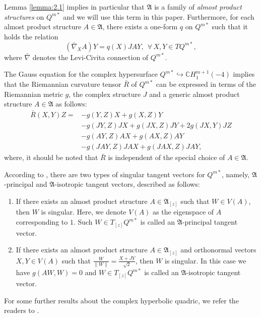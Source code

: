 \documentclass[reqno]{amsart}%
\theoremstyle{definition}
\numberwithin{equation}{section}
\begin{document}
Lemma \ref{lemma:2.1} implies in
particular that $\mathfrak{A}$ is a family of {\it almost product structures}
on $Q^{m*}$ and we will use this term in this paper.
Furthermore, for each almost product structure $A\in\mathfrak{A}$, there exists a
one-form $q$ on $Q^{m*}$ such that it holds the relation
%
\begin{equation}\label{eqn:2.2}
(\bar{\nabla}_XA)Y=q(X)JAY,\ \ \forall\, X,Y\in TQ^{m*},
\end{equation}
%
where $\bar{\nabla}$ denotes the Levi-Civita connection of $Q^{m*}$.

The Gauss equation for the complex hypersurface $Q^{m*}\hookrightarrow \mathbb{C}H^{m+1}_1(-4)$
implies that the Riemannian curvature tensor $\bar{R}$ of $Q^{m*}$ can be expressed in terms
of the Riemannian metric $g$, the complex structure $J$ and a generic almost product
structure $A\in\mathfrak{A}$ as follows:
%
\begin{equation}\label{eqn:2.3}
\begin{aligned}
\bar{R}(X,Y)Z=&-g(Y,Z)X+g(X,Z)Y\\
&-g(JY,Z)JX+g(JX,Z)JY+2g(JX,Y)JZ\\
&-g(AY,Z)AX+g(AX,Z)AY\\
&-g(JAY,Z)JAX+g(JAX,Z)JAY,
\end{aligned}
\end{equation}
%
where, it should be noted that $\bar{R}$ is independent of the special choice of $A\in\mathfrak{A}$.

According to \cite{BS-2022}, there are two types of singular tangent vectors for $Q^{m*}$, namely,
$\mathfrak{A}$-principal and $\mathfrak{A}$-isotropic tangent vectors, described as
follows: %
%
\begin{enumerate}[1.]
\item%
If there exists an almost product structure $A\in \mathfrak{A}_{[z]}$ such that $W\in V(A)$,
then $W$ is singular. Here, we denote $V(A)$ as
the eigenspace of $A$ corresponding to $1$. Such $W\in T_{[z]}Q^{m*}$ is called an
$\mathfrak{A}$-principal tangent vector.

\item%
If there exists an almost product structure $A\in \mathfrak{A}_{[z]}$ and orthonormal
vectors $X,Y\in V(A)$ such that $\tfrac{W}{\|W\|}=\tfrac{X+JY}{\sqrt{2}}$, then $W$ is
singular. In this case we have $g(AW,W)=0$ and $W\in T_{[z]}Q^{m*}$ is
called an $\mathfrak{A}$-isotropic tangent vector.
\end{enumerate}
For some further results about the complex hyperbolic quadric, we refer the readers to \cite{BS-2022,K-S,M-R,V-W}.
\end{document}
